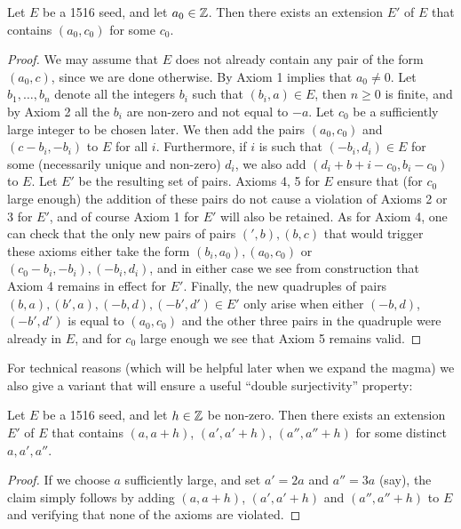 \begin{lemma}[1516 extension]\label{1516-ext}  Let $E$ be a 1516 seed, and let $a_0 \in \mathbb{Z}$.  Then there exists an extension $E'$ of $E$ that contains $(a_0,c_0)$ for some $c_0$.
\end{lemma}

\begin{proof}  We may assume that $E$ does not already contain any pair of the form $(a_0,c)$, since we are done otherwise.  By Axiom 1 implies that $a_0 \neq 0$.  Let $b_1,\dots,b_n$ denote all the integers $b_i$ such that $(b_i,a) \in E$, then $n \geq 0$ is finite, and by Axiom 2 all the $b_i$ are non-zero and not equal to $-a$.  Let $c_0$ be a sufficiently large integer to be chosen later.  We then add the pairs $(a_0,c_0)$ and $(c-b_i,-b_i)$ to $E$ for all $i$.  Furthermore, if $i$ is such that $(-b_i,d_i) \in E$ for some (necessarily unique and non-zero) $d_i$, we also add $(d_i+b+i-c_0, b_i-c_0)$ to $E$.  Let $E'$ be the resulting set of pairs. Axioms 4, 5 for $E$ ensure that (for $c_0$ large enough) the addition of these pairs do not cause a violation of Axioms 2 or 3 for $E'$, and of course Axiom 1 for $E'$ will also be retained.  As for Axiom 4, one can check that the only new pairs of pairs $(',b), (b,c)$ that would trigger these axioms either take the form $(b_i,a_0), (a_0,c_0)$ or $(c_0-b_i,-b_i), (-b_i,d_i)$, and in either case we see from construction that Axiom 4 remains in effect for $E'$.  Finally, the new quadruples of pairs $(b,a), (b',a), (-b, d), (-b',d') \in E'$ only arise when either $(-b,d)$, $(-b',d')$ is equal to $(a_0,c_0)$ and the other three pairs in the quadruple were already in $E$, and for $c_0$ large enough we see that Axiom 5 remains valid.
\end{proof}

For technical reasons (which will be helpful later when we expand the magma) we also give a variant that will ensure a useful ``double surjectivity'' property:

\begin{lemma}\label{1516-ext-var}  Let $E$ be a 1516 seed, and let $h \in \mathbb{Z}$ be non-zero.  Then there exists an extension $E'$ of $E$ that contains $(a,a+h)$, $(a',a'+h)$, $(a'',a''+h)$ for some distinct $a,a',a''$.
\end{lemma}

\begin{proof}  If we choose $a$ sufficiently large, and set $a' = 2a$ and $a''=3a$ (say), the claim simply follows by adding $(a,a+h)$, $(a',a'+h)$ and $(a'',a''+h)$ to $E$ and verifying that none of the axioms are violated.
\end{proof}



